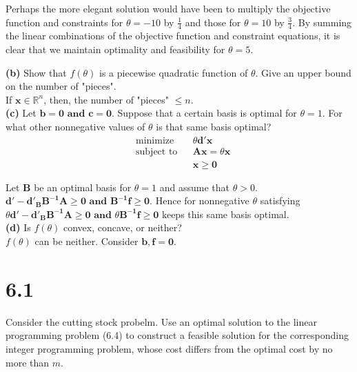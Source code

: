 \documentclass{article}
\begin{document}
\noindent 
Perhaps the more elegant solution would have been to multiply the objective function and constraints for $\theta = -10$ by $\frac{1}{4}$ and those for $\theta = 10$ by $\frac{3}{4}$.  By summing the linear combinations of the objective function and constraint equations, it is clear that we maintain optimality and feasibility for $\theta = 5$.  

\noindent
\textbf{(b)}  Show that $f(\theta)$ is a piecewise quadratic function of $\theta$.  Give an upper bound on the number of "pieces". \\

\noindent
If $\mathbf{x} \in \mathbb{R}^n$, then, the number of "pieces" $\leq n$. \\


\noindent
\textbf{(c)}  Let $\mathbf{b = 0 \text{ and } c = 0}$.  Suppose that a certain basis is optimal for $\theta = 1$.  For what other nonnegative values of $\theta$ is that same basis optimal? \\

\noindent
\begin{equation*}
\begin{aligned}
& \text{minimize} && \theta\mathbf{d'x} \\
& \text{subject to} && \mathbf{Ax = } \theta \mathbf{x} \\
& && \mathbf{x \geq 0}
\end{aligned}
\end{equation*}

\noindent
Let $\mathbf{B}$ be an optimal basis for $\theta = 1$ and assume that $\theta > 0$.  $\mathbf{d' - d'_B B^{-1} A \geq 0 \text{ and } B^{-1}f \geq 0}$.  Hence for nonnegative $\theta$ satisfying $\theta \mathbf{d' - d'_B B^{-1} A \geq 0 \text{ and } } \theta \mathbf{B^{-1}f \geq 0}$ keeps this same basis optimal. \\

\noindent
\textbf{(d)} Is $f(\theta)$ convex, concave, or neither? \\

\noindent
$f(\theta)$ can be neither.  Consider $\mathbf{b, f = 0}$. \\

\section*{6.1}
Consider the cutting stock probelm.  Use an optimal solution to the linear programming problem (6.4) to construct a feasible solution for the corresponding integer programming problem, whose cost differs from the optimal cost by no more than $m$.  \\
\end{document}
